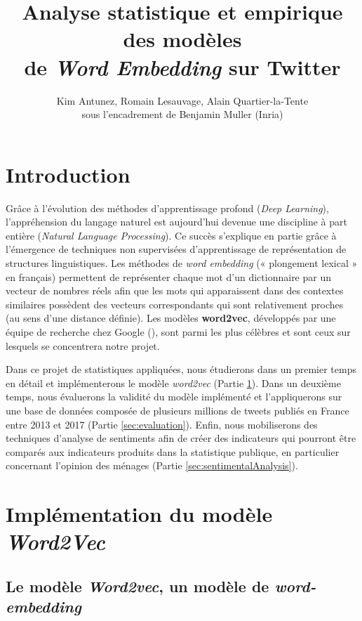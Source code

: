 \documentclass[11pt,french,french]{article}
\title{Analyse statistique et empirique des modèles\\
de \emph{Word Embedding} sur Twitter}
\author{Kim Antunez, Romain Lesauvage, Alain Quartier-la-Tente\\
sous l'encadrement de Benjamin Muller (Inria)}
\date{}
\begin{document}
\maketitle


{
\hypersetup{linkcolor=black}
\setcounter{tocdepth}{2}
\tableofcontents
}
\section*{Introduction}\label{introduction}

Grâce à l'évolution des méthodes d'apprentissage profond (\emph{Deep
Learning}), l'appréhension du langage naturel est aujourd'hui devenue
une discipline à part entière (\emph{Natural Language Processing}). Ce
succès s'explique en partie grâce à l'émergence de techniques non
supervisées d'apprentissage de représentation de structures
linguistiques. Les méthodes de \emph{word embedding} (« plongement
lexical » en français) permettent de représenter chaque mot d'un
dictionnaire par un vecteur de nombres réels afin que les mots qui
apparaissent dans des contextes similaires possèdent des vecteurs
correspondants qui sont relativement proches (au sens d'une distance
définie). Les modèles \textbf{word2vec}, développés par une équipe de
recherche chez Google (\cite{Mikolov}), sont parmi les plus célèbres et
sont ceux sur lesquels se concentrera notre projet.

Dans ce projet de statistiques appliquées, nous étudierons dans un
premier temps en détail et implémenterons le modèle \emph{word2vec}
(Partie \ref{sec:word2vec}). Dans un deuxième temps, nous évaluerons la
validité du modèle implémenté et l'appliquerons sur une base de données
composée de plusieurs millions de tweets publiés en France entre 2013 et
2017 (Partie \ref{sec:evaluation}). Enfin, nous mobiliserons des
techniques d'analyse de sentiments afin de créer des indicateurs qui
pourront être comparés aux indicateurs produits dans la statistique
publique, en particulier concernant l'opinion des ménages (Partie
\ref{sec:sentimentalAnalysis}).

\section{\texorpdfstring{Implémentation du modèle
\emph{Word2Vec}}{Implémentation du modèle Word2Vec}}\label{sec:word2vec}

\subsection{\texorpdfstring{Le modèle \emph{Word2vec}, un modèle de
\emph{word-embedding}}{Le modèle Word2vec, un modèle de word-embedding}}\label{le-moduxe8le-word2vec-un-moduxe8le-de-word-embedding}
\end{document}
